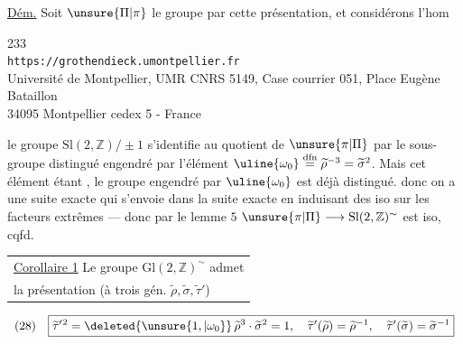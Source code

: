 \uline{Dém.} Soit $\unsure{\Pi|\pi}$ le groupe   par cette présentation, et considérons l'hom


\begin{center}
233\\
\texttt{https://grothendieck.umontpellier.fr}\\
Université de Montpellier, UMR CNRS 5149, Case courrier 051, Place Eugène Bataillon\\
34095 Montpellier cedex 5 - France
\end{center}

le groupe $\mathrm{Sl}(2,\mathbb Z)/\pm1$ s'identifie au quotient de $\unsure{\pi|\Pi}$ par le sous-groupe distingué engendré par l'élément $\uline{\omega_0}\overset{\mathrm{dfn}}{=}\widetilde\rho^{-3}=\widetilde\sigma^2$.
Mais cet élément étant , le groupe engendré par $\uline{\omega_0}$ est déjà distingué.
donc on a une suite exacte
qui s'envoie dans la suite exacte
en induisant des iso  sur les facteurs extrêmes --- donc par le lemme  $5$
$\unsure{\pi|\Pi}\longrightarrow\mathrm{Sl}(2,\mathbb Z)^{\sim}$ est iso, cqfd.

\begin{tabular}{|l}
\uline{Corollaire 1} Le groupe $\mathrm{Gl}(2,\mathbb Z)^{\sim}$ admet\\
la présentation (à trois gén. $\widetilde\rho,\widetilde\sigma,\widetilde\tau'$)
\end{tabular}
\[
\begin{array}{ll}
(28)&\boxed{
\widetilde\tau'{}^{2}=\deleted{\unsure{1,|\omega_0}}\,
\widetilde\rho^3\cdot\widetilde\sigma^2=1,\quad
\widetilde\tau'(\widetilde\rho)=\widetilde\rho^{-1},\quad
\widetilde\tau'(\widetilde\sigma)=\widetilde\sigma^{-1}}
\end{array}
\]

